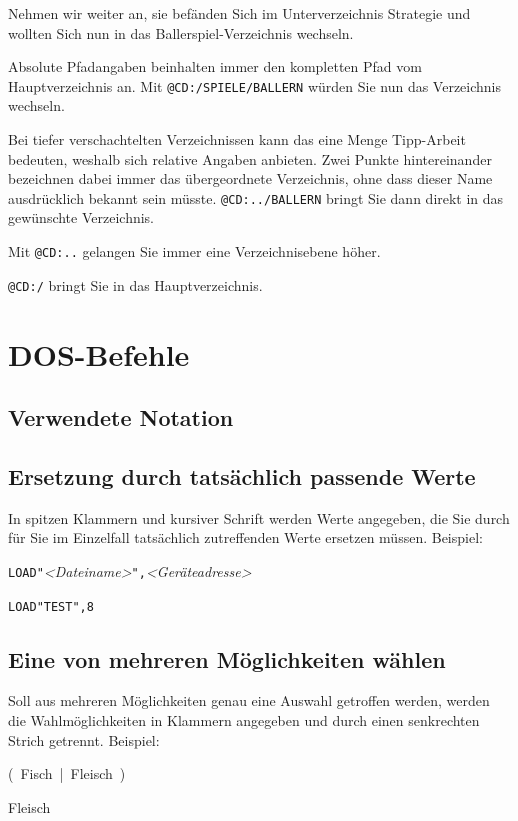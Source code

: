 \documentclass[10pt,a4paper]{scrartcl}		%
\begin{document}
Nehmen wir weiter an, sie befänden Sich im Unterverzeichnis Strategie
und wollten Sich nun in das Ballerspiel-Verzeichnis wechseln.

Absolute Pfadangaben beinhalten immer den kompletten Pfad vom
Hauptverzeichnis an. Mit \texttt{@CD:/SPIELE/BALLERN} würden Sie nun
das Verzeichnis wechseln.

Bei tiefer verschachtelten Verzeichnissen kann das eine Menge Tipp-Arbeit
bedeuten, weshalb sich relative Angaben anbieten. Zwei Punkte hintereinander
bezeichnen dabei immer das übergeordnete Verzeichnis, ohne dass
dieser Name ausdrücklich bekannt sein müsste. \texttt{@CD:../BALLERN}
bringt Sie dann direkt in das gewünschte Verzeichnis.

Mit \texttt{@CD:..} gelangen Sie immer eine Verzeichnisebene höher.

\texttt{@CD:/} bringt Sie in das Hauptverzeichnis.

\clearpage
\section{DOS-Befehle}
\subsection{Verwendete Notation}
\subsection*{Ersetzung durch tatsächlich passende Werte}
In spitzen Klammern und kursiver Schrift werden Werte angegeben, die 
Sie durch für Sie im Einzelfall tatsächlich
zutreffenden Werte ersetzen müssen. Beispiel:

\texttt{LOAD"}\textit{<Dateiname>}\texttt{",}\textit{<Geräteadresse>}

\texttt{LOAD"TEST",8}

\subsection*{Eine von mehreren Möglichkeiten wählen}
Soll aus mehreren Möglichkeiten genau eine Auswahl getroffen werden,
werden die Wahlmöglichkeiten in Klammern angegeben und durch einen
senkrechten Strich getrennt. Beispiel:

\mbox{\Big( Fisch \Big| \normalsize Fleisch \Big) \normalsize} 

Fleisch
\end{document}
